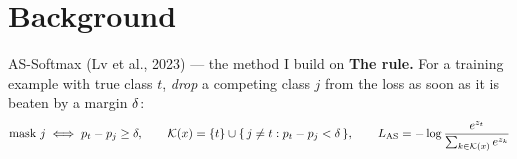 \section{Background}

\begin{frame}{AS-Softmax (Lv et al., 2023) --- the method I build on}
  \small
  \textbf{The rule.} For a training example with true class $t$, \emph{drop}
  a competing class $j$ from the loss as soon as it is beaten by a margin $\delta$:
  \vspace{-0.4em}
  \[
    \text{mask } j \iff p_t - p_j \geq \delta,
    \qquad
    \mathcal{K}(x) = \{t\} \cup \{\, j\neq t : p_t - p_j < \delta \,\},
    \qquad
    L_{\mathrm{AS}} = -\log \frac{e^{z_t}}{\sum_{k \in \mathcal{K}(x)} e^{z_k}}
  \]
  \vspace{-1.0em}


\end{frame}
